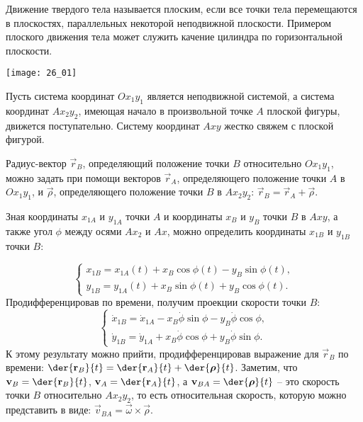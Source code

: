 
Движение твердого тела называется плоским, если все точки тела перемещаются в
плоскостях, параллельных некоторой неподвижной плоскости. Примером плоского
движения тела может служить качение цилиндра по горизонтальной плоскости.

\begin{minipage}{.4\textwidth}
    \texttt{[image: 26\_01]}
\end{minipage}
\begin{minipage}{.55\textwidth}
Пусть система координат \( Ox_1y_1 \) является неподвижной системой, а система
координат \( Ax_2y_2 \), имеющая начало в произвольной точке \( A \) плоской
фигуры, движется поступательно. Систему координат \( Axy \) жестко свяжем с
плоской фигурой.

Радиус-вектор \( \vec{r}_B \), определяющий положение точки \( B \) относительно
\( Ox_1y_1 \), можно задать при помощи векторов \( \vec{r}_A \), определяющего
положение точки \( A \) в \( Ox_1y_1 \), и \( \vec{\rho} \), определяющего
положение точки \( B \) в \( Ax_2y_2 \): \(\vec{r}_B = \vec{r}_A + \vec{\rho}\).

Зная координаты \( x_{1A} \) и \( y_{1A} \) точки \( A \) и координаты \( x_B \)
и \( y_B \) точки \( B \) в \( Axy \), а также угол \( \phi \) между осями
\( Ax_2 \) и \( Ax \), можно определить координаты \( x_{1B} \) и \( y_{1B} \)
точки \( B \):
\end{minipage}
\[
    \left\{ \begin{array}{l}
        x_{1B} = x_{1A}(t) + x_B\cos\phi(t) - y_B\sin\phi(t), \\
        y_{1B} = y_{1A}(t) + x_B\sin\phi(t) + y_B\cos\phi(t).
    \end{array} \right.
\]
Продифференцировав по времени, получим проекции скорости точки \( B \):
\[
    \left\{ \begin{array}{l}
        \dot{x}_{1B} = \dot{x}_{1A} - x_B\dot{\phi}\sin\phi -
        y_B\dot{\phi}\cos\phi, \\
        \dot{y}_{1B} = \dot{y}_{1A} + x_B\dot{\phi}\cos\phi +
        y_B\dot{\phi}\sin\phi.
    \end{array} \right.
\]
К этому результату можно прийти, продифференцировав выражение для
\( \vec{r}_B \) по времени: \( \ds \der{\vec{r}_B}{t} = \der{\vec{r}_A}{t} +
\der{\vec{\rho}}{t} \). Заметим, что \( \ds \vec{v}_B = \der{\vec{r}_B}{t} \),
\( \ds \vec{v}_A = \der{\vec{r}_A}{t} \), а \( \ds \vec{v}_{BA} =
\der{\vec{\rho}}{t} \) -- это скорость точки \( B \) относительно \( Ax_2y_2 \),
то есть относительная скорость, которую можно представить в виде:
\( \vec{v}_{BA} = \vec{\omega}\times\vec{\rho} \).


